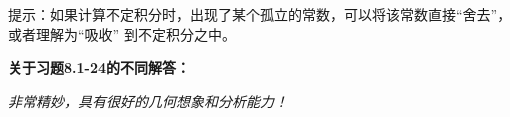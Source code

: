 提示：如果计算不定积分时，出现了某个孤立的常数，可以将该常数直接“舍去”，或者理解为“吸收”
到不定积分之中。

\newpage

{\bf 关于习题8.1-24的不同解答：}

\begin{center}
\end{center}

{\it 非常精妙，具有很好的几何想象和分析能力！}

\begin{center}
\end{center}

